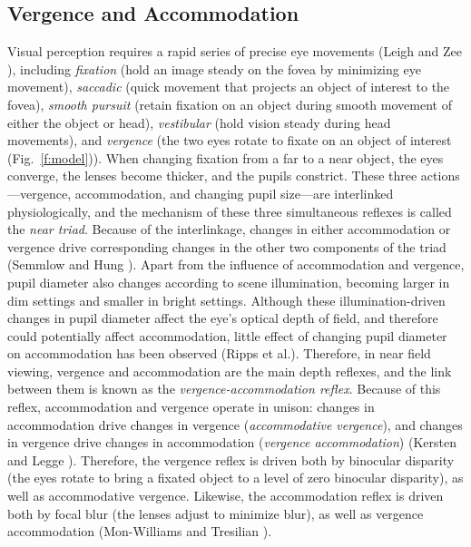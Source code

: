 \documentclass[10pt,journal,compsoc]{IEEEtran}
\makeatletter
\newcommand{\etal}{et al.\@\xspace} %
\makeatother
\begin{document}
\subsection{Vergence and Accommodation}

Visual perception requires a rapid series of precise eye movements (Leigh and Zee \cite{leigh:2015}), including 
\emph{fixation} (hold an image steady on the fovea by minimizing eye movement),
\emph{saccadic} (quick movement that projects an object of interest to the fovea), 
\emph{smooth pursuit} (retain fixation on an object during smooth movement of either the object or head),
\emph{vestibular} (hold vision steady during head movements), and
\emph{vergence} (the two eyes rotate to fixate on an object of interest (Fig.~\ref{f:model})).  
When changing fixation from a far to a near object, the eyes converge, the lenses become thicker, and the pupils constrict.  These three actions---vergence, accommodation, and changing pupil size---are interlinked physiologically, and the mechanism of these three simultaneous reflexes is called the \emph{near triad}.  Because of the interlinkage, changes in either accommodation or vergence drive corresponding changes in the other two components of the triad (Semmlow and Hung \cite{semmlow:1983}).  Apart from the influence of accommodation and vergence, pupil diameter also changes according to scene illumination, becoming larger in dim settings and smaller in bright settings.  Although these illumination-driven changes in pupil diameter affect the eye's optical depth of field, and therefore could potentially affect accommodation, little effect of changing pupil diameter on accommodation has been observed (Ripps \etal \cite{ripps:1962}).  Therefore, in near field viewing, vergence and accommodation are the main depth reflexes, and the link between them is known as the \emph{vergence-accommodation reflex}.  Because of this reflex, accommodation and vergence operate in unison: changes in accommodation drive changes in vergence (\emph{accommodative vergence}), and changes in vergence drive changes in accommodation (\emph{vergence accommodation}) (Kersten and Legge \cite{kersten:1983}).  Therefore, the vergence reflex is driven both by binocular disparity (the eyes rotate to bring a fixated object to a level of zero binocular disparity), as well as accommodative vergence.  Likewise, the accommodation reflex is driven both by focal blur (the lenses adjust to minimize blur), as well as vergence accommodation (Mon-Williams and Tresilian \cite{monwilliams:2000}).   
\end{document}
